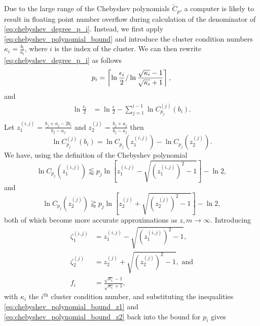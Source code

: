 Due to the large range of the Chebyshev polynomials $\tilde{C}_p$, a computer is likely to result in floating point number overflow during calculation of the denominator of \cref{eq:chebyshev_degree_p_i}. Instead, we first apply \cref{eq:chebyshev_polynomial_bound} and introduce the cluster condition numbers $\kappa_i = \frac{b_i}{a_i}$, where $i$ is the index of the cluster. We can then rewrite \cref{eq:chebyshev_degree_p_i} as follows
\begin{equation*}
    p_i  =  \left\lceil\ln{\frac{\epsilon_i}{2}} / \ln{\frac{\sqrt{\kappa_i} - 1}{\sqrt{\kappa_i} + 1}}\right\rceil, \\
\end{equation*}
and
\begin{align*}
    \ln{\frac{\epsilon_i}{2}} & = \ln{\frac{\epsilon}{2}} - \sum_{j=1}^{i-1} \ln{C^{(j)}_{p_j}(b_i)}. \\
\end{align*}
Let $z^{(i,j)}_1 = \frac{b_j + a_j - 2b_i}{b_j - a_j}$ and $z^{(j)}_2 = \frac{b_j + a_j}{b_j - a_j}$ then
\begin{equation*}
    \ln{C^{(j)}_{p_j}(b_i)} = \ln{C_{p_j}(z^{(i,j)}_1)} - \ln{C_{p_j}(z^{(j)}_2)}.
\end{equation*}
We have, using the definition of the Chebyshev polynomial
\begin{equation}
    \ln{C_{p_j}(z^{(i,j)}_1)} \lessapprox p_j \ln{\left[z^{(i,j)}_1 - \sqrt{\left(z^{(i,j)}_1\right)^2 - 1}\right]} - \ln{2},
    \label{eq:chebyshev_polynomial_bound_z1}
\end{equation}
and
\begin{equation}
    \ln{C_{p_j}(z^{(j)}_2)} \gtrapprox p_j \ln{\left[z^{(j)}_2 + \sqrt{\left(z^{(j)}_2\right)^2 - 1}\right]} - \ln{2},
    \label{eq:chebyshev_polynomial_bound_z2}
\end{equation}
both of which become more accurate approximations as $z,m\rightarrow\infty$. Introducing 
\begin{align*}
    \zeta^{(i,j)}_1 &= z^{(i,j)}_1 - \sqrt{\left(z^{(i,j)}_1\right)^2 - 1}, \\
    \zeta^{(j)}_2 &= z^{(j)}_2 + \sqrt{\left(z^{(j)}_2\right)^2 - 1}, \text{ and}\\
    f_i &= \frac{\sqrt{\kappa_i} - 1}{\sqrt{\kappa_i} + 1},
\end{align*}
with $\kappa_i$ the $i^{\text{th}}$ cluster condition number, and substituting the inequalities \ref{eq:chebyshev_polynomial_bound_z1} and \ref{eq:chebyshev_polynomial_bound_z2} back into the bound for $p_i$ gives

